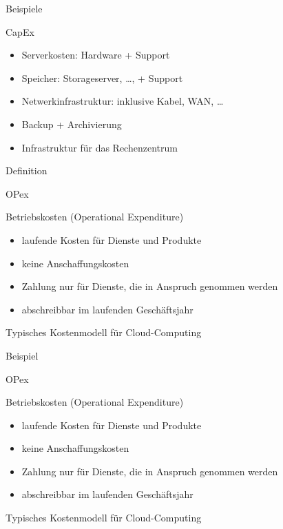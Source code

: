 \documentclass{scrartcl}
\newenvironment{flashcard}[2][]{%
    #1
    \vfill
    \centerline{\Large{#2}}
    \vfill
\newpage
}
{\newpage}
\begin{document}
    \begin{flashcard}[Beispiele]{CapEx}
        \begin{itemize}
            \item Serverkosten: Hardware + Support
            \item Speicher: Storageserver, \ldots, + Support
            \item Netwerkinfrastruktur: inklusive Kabel, WAN, \ldots
            \item Backup + Archivierung
            \item Infrastruktur für das Rechenzentrum
        \end{itemize}
    \end{flashcard}

    \begin{flashcard}[Definition]{OPex}
        Betriebskosten (Operational Expenditure)
        \begin{itemize}
            \item laufende Kosten für Dienste und Produkte
            \item keine Anschaffungskosten
            \item Zahlung nur für Dienste, die in Anspruch genommen werden
            \item abschreibbar im laufenden Geschäftsjahr
        \end{itemize}

        Typisches Kostenmodell für Cloud-Computing
    \end{flashcard}

    \begin{flashcard}[Beispiel]{OPex}
        Betriebskosten (Operational Expenditure)
        \begin{itemize}
            \item laufende Kosten für Dienste und Produkte
            \item keine Anschaffungskosten
            \item Zahlung nur für Dienste, die in Anspruch genommen werden
            \item abschreibbar im laufenden Geschäftsjahr
        \end{itemize}

        Typisches Kostenmodell für Cloud-Computing
    \end{flashcard}
\end{document}
